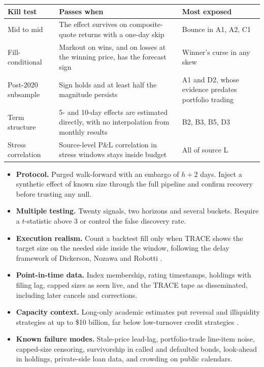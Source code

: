 \documentclass[11pt,letterpaper]{article}
\begin{document}
\begin{center}
\begin{tabularx}{\textwidth}{@{}l X X@{}}
\toprule
Kill test & Passes when & Most exposed \\
\midrule
Mid to mid & The effect survives on composite-quote returns with a one-day skip & Bounce in A1, A2, C1 \\
Fill-conditional & Markout on wins, and on losses at the winning price, has the forecast sign & Winner's curse in any skew \\
Post-2020 subsample & Sign holds and at least half the magnitude persists & A1 and D2, whose evidence predates portfolio trading \\
Term structure & 5- and 10-day effects are estimated directly, with no interpolation from monthly results & B2, B3, B5, D3 \\
Stress correlation & Source-level P\&L correlation in stress windows stays inside budget & All of source L \\
\bottomrule
\end{tabularx}
\end{center}

\begin{itemize}[itemsep=2pt]
\item \textbf{Protocol.} Purged walk-forward with an embargo of $h+2$ days. Inject a synthetic effect of known size through the full pipeline and confirm recovery before trusting any null.
\item \textbf{Multiple testing.} Twenty signals, two horizons and several buckets. Require a $t$-statistic above 3 or control the false discovery rate.
\item \textbf{Execution realism.} Count a backtest fill only when TRACE shows the target size on the needed side inside the window, following the delay framework of Dickerson, Nozawa and Robotti \cite{dnr2024}.
\item \textbf{Point-in-time data.} Index membership, rating timestamps, holdings with filing lag, capped sizes as seen live, and the TRACE tape as disseminated, including later cancels and corrections.
\item \textbf{Capacity context.} Long-only academic estimates put reversal and illiquidity strategies at up to \$10 billion, far below low-turnover credit strategies \cite{ivakos2024}.
\item \textbf{Known failure modes.} Stale-price lead-lag, portfolio-trade line-item noise, capped-size censoring, survivorship in called and defaulted bonds, look-ahead in holdings, private-side loan data, and crowding on public calendars.
\end{itemize}
\end{document}
